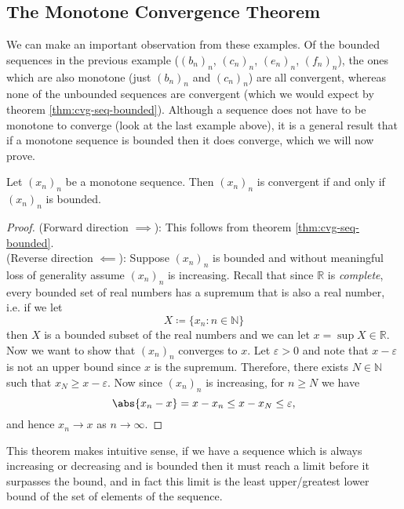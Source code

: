 \documentclass[../real_analysis.tex]{subfiles}
\begin{document}
        \subsection{The Monotone Convergence Theorem}\label{subsec:monotone-convergence-theorem}
            We can make an important observation from these examples. Of the bounded sequences in the previous example ($(b_n)_n$, $(c_n)_n$, $(e_n)_n$, $(f_n)_n$), the ones which are also monotone (just $(b_n)_n$ and $(c_n)_n$) are all convergent, whereas none of the unbounded sequences are convergent (which we would expect by theorem \ref{thm:cvg-seq-bounded}).
            Although a sequence does not have to be monotone to converge (look at the last example above), it is a general result that if a monotone sequence is bounded then it does converge, which we will now prove.
            \begin{theorem}\label{thm:MCT}
                Let $(x_n)_n$ be a monotone sequence. Then $(x_n)_n$ is convergent if and only if $(x_n)_n$ is bounded.
            \end{theorem}
            \begin{proof}
                (Forward direction $\implies$): This follows from theorem \ref{thm:cvg-seq-bounded}.\\
                (Reverse direction $\impliedby$): Suppose $(x_n)_n$ is bounded and without meaningful loss of generality assume $(x_n)_n$ is increasing. Recall that since $\mathbb{R}$ is \textit{complete}, every bounded set of real numbers has a supremum that is also a real number, i.e. if we let
                \begin{equation}
                    X\coloneqq\{x_n:n\in\mathbb{N}\}
                \end{equation}
                then $X$ is a bounded subset of the real numbers and we can let $x=\sup X\in\mathbb{R}$. Now we want to show that $(x_n)_n$ converges to $x$. Let $\varepsilon>0$ and note that $x-\varepsilon$ is not an upper bound since $x$ is the supremum. Therefore, there exists $N\in\mathbb{N}$ such that $x_N\geq x-\varepsilon$. Now since $(x_n)_n$ is increasing, for $n\geq N$ we have
                \begin{equation}
                    \abs{x_n-x}=x-x_n\leq x-x_N\leq\varepsilon,
                \end{equation}
                and hence $x_n\to x$ as $n\to\infty$.
            \end{proof}
            This theorem makes intuitive sense, if we have a sequence which is always increasing or decreasing and is bounded then it must reach a limit before it surpasses the bound, and in fact this limit is the least upper/greatest lower bound of the set of elements of the sequence.
\end{document}
